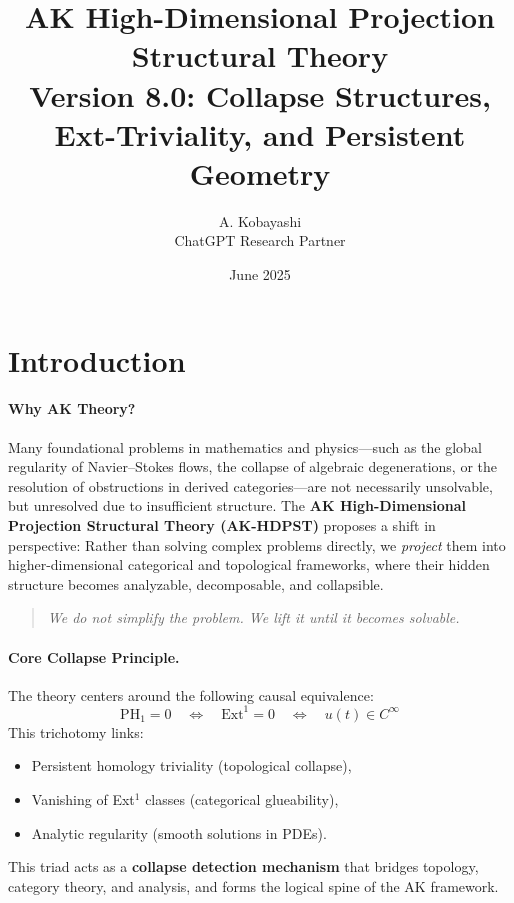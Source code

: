 \documentclass[11pt]{article}
\title{AK High-Dimensional Projection Structural Theory\\
\Large Version 8.0: Collapse Structures, Ext-Triviality, and Persistent Geometry}
\author{A. Kobayashi \\ \small ChatGPT Research Partner}
\date{June 2025}
\begin{document}
\maketitle

\tableofcontents
\newpage

\section{Introduction}

\paragraph{Why AK Theory?}
Many foundational problems in mathematics and physics—such as the global regularity of Navier–Stokes flows, the collapse of algebraic degenerations, or the resolution of obstructions in derived categories—are not necessarily unsolvable, but unresolved due to insufficient structure.  
The \textbf{AK High-Dimensional Projection Structural Theory (AK-HDPST)} proposes a shift in perspective:  
Rather than solving complex problems directly, we \emph{project} them into higher-dimensional categorical and topological frameworks, where their hidden structure becomes analyzable, decomposable, and collapsible.

\begin{quote}
\emph{We do not simplify the problem. We lift it until it becomes solvable.}
\end{quote}

\paragraph{Core Collapse Principle.}
The theory centers around the following causal equivalence:
\[
\mathrm{PH}_1 = 0 \quad \Leftrightarrow \quad \mathrm{Ext}^1 = 0 \quad \Leftrightarrow \quad u(t) \in C^\infty
\]
This trichotomy links:
\begin{itemize}
  \item Persistent homology triviality (topological collapse),
  \item Vanishing of Ext$^1$ classes (categorical glueability),
  \item Analytic regularity (smooth solutions in PDEs).
\end{itemize}
This triad acts as a \textbf{collapse detection mechanism} that bridges topology, category theory, and analysis, and forms the logical spine of the AK framework.
\end{document}
